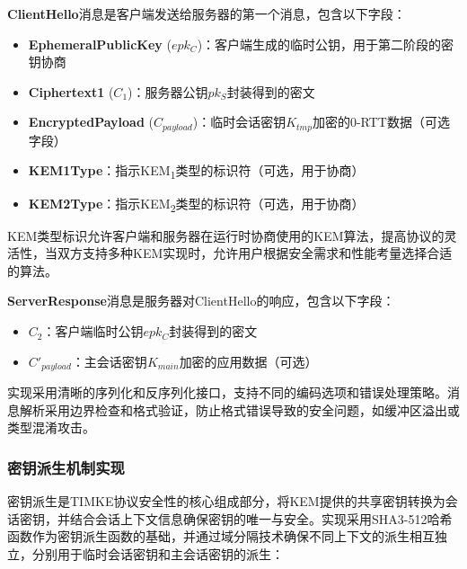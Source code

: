 \textbf{ClientHello}消息是客户端发送给服务器的第一个消息，包含以下字段：
\begin{itemize}
  \item \textbf{EphemeralPublicKey} ($epk_C$)：客户端生成的临时公钥，用于第二阶段的密钥协商
  \item \textbf{Ciphertext1} ($C_1$)：服务器公钥$pk_S$封装得到的密文
  \item \textbf{EncryptedPayload} ($C_{payload}$)：临时会话密钥$K_{tmp}$加密的0-RTT数据（可选字段）
  \item \textbf{KEM1Type}：指示KEM\textsubscript{1}类型的标识符（可选，用于协商）
  \item \textbf{KEM2Type}：指示KEM\textsubscript{2}类型的标识符（可选，用于协商）
\end{itemize}

KEM类型标识允许客户端和服务器在运行时协商使用的KEM算法，提高协议的灵活性，当双方支持多种KEM实现时，允许用户根据安全需求和性能考量选择合适的算法。

\textbf{ServerResponse}消息是服务器对ClientHello的响应，包含以下字段：

\begin{itemize}
    \item $C_2$：客户端临时公钥$epk_C$封装得到的密文
    \item $C'_{payload}$：主会话密钥$K_{main}$加密的应用数据（可选）
\end{itemize}

实现采用清晰的序列化和反序列化接口，支持不同的编码选项和错误处理策略。消息解析采用边界检查和格式验证，防止格式错误导致的安全问题，如缓冲区溢出或类型混淆攻击。

\subsubsection{密钥派生机制实现}
\label{subsubsec:key_derivation_impl}

密钥派生是TIMKE协议安全性的核心组成部分，将KEM提供的共享密钥转换为会话密钥，并结合会话上下文信息确保密钥的唯一与安全。实现采用SHA3-512哈希函数作为密钥派生函数的基础，并通过域分隔技术确保不同上下文的派生相互独立，分别用于临时会话密钥和主会话密钥的派生：

